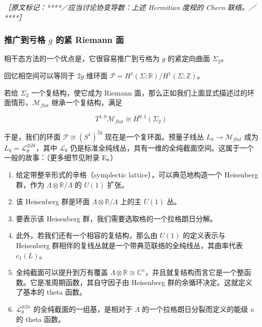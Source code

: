 {\small\itshape ［原文标记：****／应当讨论协变导数：上述 Hermitian 度规的 Chern 联络。／****］}

\subsubsection*{推广到亏格 $g$ 的紧 Riemann 面} %

相干态方法的一个优点是，它很容易推广到亏格为 $g$ 的紧定向曲面 $\Sigma_2$。

回忆相空间可以等同于 $2g$ 维环面 $\mathcal{P}=H^1(\Sigma;\mathbb{R})/H^1(\Sigma;\mathbb{Z})$。

若给 $\Sigma_2$ 一个复结构，使它成为 Riemann 面，那么正如我们上面显式描述过的环面情形，$\mathcal{M}_{flat}$ 继承一个复结构，满足

\begin{equation}
  T^{1,0}\mathcal{M}_{flat}\cong H^{0,1}(\Sigma_2)
  \tag{2.178}
  \label{eq:2.178}
\end{equation}

于是，我们的环面 $\mathcal{P}\cong(S^1)^{2g}$ 现在是一个复环面。预量子线丛 $L_k\to\mathcal{M}_{flat}$ 成为 $L_k=\mathcal{L}_\theta^{\otimes 2k}$，其中 $\mathcal{L}_\theta$ 仍是标准全纯线丛，具有一维的全纯截面空间。这属于一个一般的故事：（更多细节见附录 E。）

\begin{enumerate}
  \item 给定带整辛形式的辛格（symplectic lattice），可以典范地构造一个 Heisenberg 群，作为 $\Lambda\otimes\mathbb{R}/\Lambda$ 的 $U(1)$ 扩张。
  \item 该 Heisenberg 群是环面 $\Lambda\otimes\mathbb{R}/\Lambda$ 上的主 $U(1)$ 丛。
  \item 要表示该 Heisenberg 群，我们需要选取格的一个拉格朗日分解。
  \item 此外，若我们还有一个相容的复结构，那么由 $U(1)$ 的定义表示与 Heisenberg 群相伴的复线丛就是一个带典范联络的全纯线丛，其曲率代表 $c_1(L)$。
  \item 全纯截面可以提升到万有覆盖 $\Lambda\otimes\mathbb{R}\cong\mathbb{C}^n$，并且就复结构而言它是一个整函数。它是准周期函数，其自守因子由 Heisenberg 群的余循环决定。这就定义了基本的 theta 函数。
  \item $\mathcal{L}_\theta^{\otimes 2\kappa}$ 的全纯截面的一组基，是相对于 $\Lambda$ 的一个拉格朗日分裂而定义的能级 $\kappa$ 的 theta 函数。
\end{enumerate}

